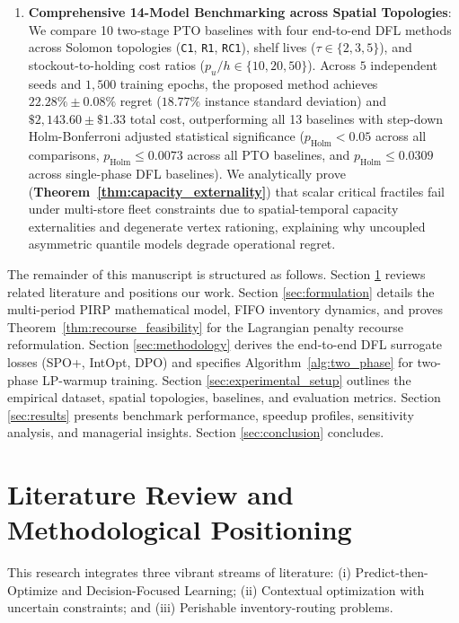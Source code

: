 \documentclass[11pt,a4paper]{article}
\theoremstyle{definition}
\theoremstyle{remark}
\begin{document}
\begin{enumerate}[leftmargin=*]
    \item \textbf{Comprehensive 14-Model Benchmarking across Spatial Topologies}: We compare 10 two-stage PTO baselines with four end-to-end DFL methods across Solomon topologies (\texttt{C1}, \texttt{R1}, \texttt{RC1}), shelf lives ($\tau \in \{2, 3, 5\}$), and stockout-to-holding cost ratios ($p_u/h \in \{10, 20, 50\}$). Across $5$ independent seeds and $1,500$ training epochs, the proposed method achieves $22.28\% \pm 0.08\%$ regret ($18.77\%$ instance standard deviation) and $\$2,143.60 \pm \$1.33$ total cost, outperforming all 13 baselines with step-down Holm-Bonferroni adjusted statistical significance ($p_{\text{Holm}} < 0.05$ across all comparisons, $p_{\text{Holm}} \le 0.0073$ across all PTO baselines, and $p_{\text{Holm}} \le 0.0309$ across single-phase DFL baselines). We analytically prove (\textbf{Theorem~\ref{thm:capacity_externality}}) that scalar critical fractiles fail under multi-store fleet constraints due to spatial-temporal capacity externalities and degenerate vertex rationing, explaining why uncoupled asymmetric quantile models degrade operational regret.
\end{enumerate}

The remainder of this manuscript is structured as follows. Section \ref{sec:literature} reviews related literature and positions our work. Section \ref{sec:formulation} details the multi-period PIRP mathematical model, FIFO inventory dynamics, and proves Theorem~\ref{thm:recourse_feasibility} for the Lagrangian penalty recourse reformulation. Section \ref{sec:methodology} derives the end-to-end DFL surrogate losses (SPO+, IntOpt, DPO) and specifies Algorithm~\ref{alg:two_phase} for two-phase LP-warmup training. Section \ref{sec:experimental_setup} outlines the empirical dataset, spatial topologies, baselines, and evaluation metrics. Section \ref{sec:results} presents benchmark performance, speedup profiles, sensitivity analysis, and managerial insights. Section \ref{sec:conclusion} concludes.

\section{Literature Review and Methodological Positioning}
\label{sec:literature}

This research integrates three vibrant streams of literature: (i) Predict-then-Optimize and Decision-Focused Learning; (ii) Contextual optimization with uncertain constraints; and (iii) Perishable inventory-routing problems.
\end{document}
